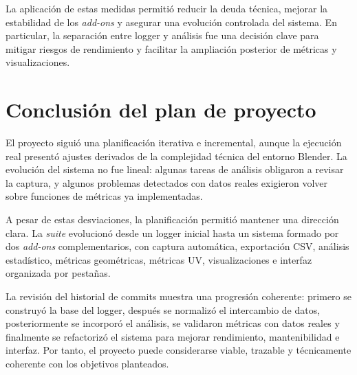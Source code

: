 La aplicación de estas medidas permitió reducir la deuda técnica, mejorar la estabilidad de los \textit{add-ons} y asegurar una evolución controlada del sistema. En particular, la separación entre logger y análisis fue una decisión clave para mitigar riesgos de rendimiento y facilitar la ampliación posterior de métricas y visualizaciones.

\section{Conclusión del plan de proyecto}
\label{sec:a-conclusion}

El proyecto siguió una planificación iterativa e incremental, aunque la ejecución real presentó ajustes derivados de la complejidad técnica del entorno Blender. La evolución del sistema no fue lineal: algunas tareas de análisis obligaron a revisar la captura, y algunos problemas detectados con datos reales exigieron volver sobre funciones de métricas ya implementadas.

A pesar de estas desviaciones, la planificación permitió mantener una dirección clara. La \textit{suite} evolucionó desde un logger inicial hasta un sistema formado por dos \textit{add-ons} complementarios, con captura automática, exportación CSV, análisis estadístico, métricas geométricas, métricas UV, visualizaciones e interfaz organizada por pestañas.

La revisión del historial de commits muestra una progresión coherente: primero se construyó la base del logger, después se normalizó el intercambio de datos, posteriormente se incorporó el análisis, se validaron métricas con datos reales y finalmente se refactorizó el sistema para mejorar rendimiento, mantenibilidad e interfaz. Por tanto, el proyecto puede considerarse viable, trazable y técnicamente coherente con los objetivos planteados.